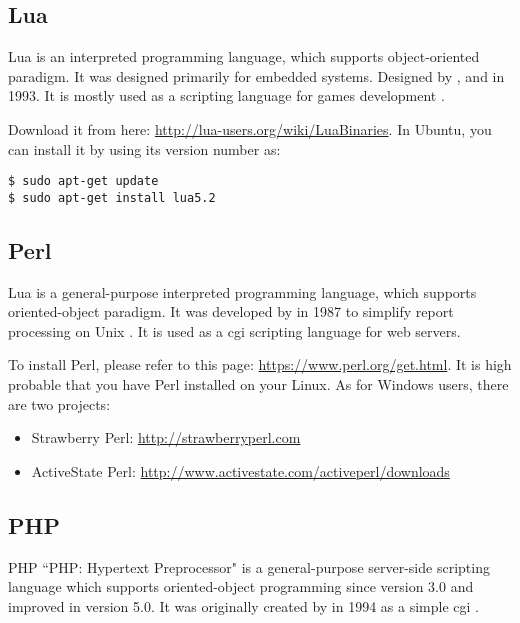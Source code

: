 \documentclass{KodeBook}
\begin{document}
\subsection{Lua}


Lua is an interpreted programming language, which supports object-oriented paradigm.
It was designed primarily for embedded systems.
Designed by ,  and  in 1993.
It is mostly used as a scripting language for games development \citep{2018-lua}.

Download it from here: \url{http://lua-users.org/wiki/LuaBinaries}. 
In Ubuntu, you can install it by using its version number as:
\begin{lstlisting}[style=shellStyle]
$ sudo apt-get update
$ sudo apt-get install lua5.2
\end{lstlisting}


\subsection{Perl}


Lua is a general-purpose interpreted programming language, which supports oriented-object paradigm. 
It was developed by  in 1987 to simplify report processing on Unix \citep{2001-ashton}.
It is used as a \ac{cgi} scripting language for web servers.

To install Perl, please refer to this page: \url{https://www.perl.org/get.html}. 
It is high probable that you have Perl installed on your Linux. 
As for Windows users, there are two projects: 
\begin{itemize}
	\item Strawberry Perl: \url{http://strawberryperl.com}
	\item ActiveState Perl: \url{http://www.activestate.com/activeperl/downloads}
\end{itemize}

\subsection{PHP}


PHP ``PHP: Hypertext Preprocessor" is a general-purpose server-side scripting language which supports oriented-object programming since version 3.0  and improved in version 5.0.
It was originally created by  in 1994 as a simple \ac{cgi} \citep{2018-cowburn}. 
\end{document}
